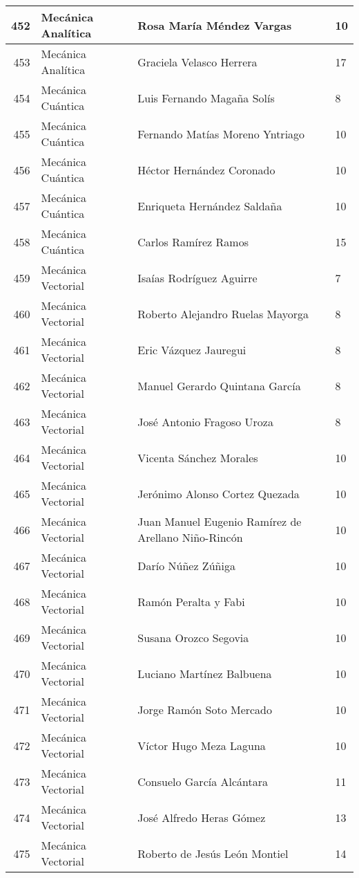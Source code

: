\begin{table}[ht]
\begin{tabular}{rlll}
  452 & Mecánica Analítica & Rosa María Méndez Vargas & 10 \\ \hline
  453 & Mecánica Analítica & Graciela Velasco Herrera & 17 \\ \hline
  454 & Mecánica Cuántica & Luis Fernando Magaña Solís & 8 \\ \hline
  455 & Mecánica Cuántica & Fernando Matías Moreno Yntriago & 10 \\ \hline
  456 & Mecánica Cuántica & Héctor Hernández Coronado & 10 \\ \hline
  457 & Mecánica Cuántica & Enriqueta Hernández Saldaña & 10 \\ \hline
  458 & Mecánica Cuántica & Carlos Ramírez Ramos & 15 \\ \hline
  459 & Mecánica Vectorial & Isaías Rodríguez Aguirre & 7 \\ \hline
  460 & Mecánica Vectorial & Roberto Alejandro Ruelas Mayorga & 8 \\ \hline
  461 & Mecánica Vectorial & Eric Vázquez Jauregui & 8 \\ \hline
  462 & Mecánica Vectorial & Manuel Gerardo Quintana García & 8 \\ \hline
  463 & Mecánica Vectorial & José Antonio Fragoso Uroza & 8 \\ \hline
  464 & Mecánica Vectorial & Vicenta Sánchez Morales & 10 \\ \hline
  465 & Mecánica Vectorial & Jerónimo Alonso Cortez Quezada & 10 \\ \hline
  466 & Mecánica Vectorial & Juan Manuel Eugenio Ramírez de Arellano Niño-Rincón & 10 \\ \hline
  467 & Mecánica Vectorial & Darío Núñez Zúñiga & 10 \\ \hline
  468 & Mecánica Vectorial & Ramón Peralta y Fabi & 10 \\ \hline
  469 & Mecánica Vectorial & Susana Orozco Segovia & 10 \\ \hline
  470 & Mecánica Vectorial & Luciano Martínez Balbuena & 10 \\ \hline
  471 & Mecánica Vectorial & Jorge Ramón Soto Mercado & 10 \\ \hline
  472 & Mecánica Vectorial & Víctor Hugo Meza Laguna & 10 \\ \hline
  473 & Mecánica Vectorial & Consuelo García Alcántara & 11 \\ \hline
  474 & Mecánica Vectorial & José Alfredo Heras Gómez & 13 \\ \hline
  475 & Mecánica Vectorial & Roberto de Jesús León Montiel & 14 \\ \hline

\end{tabular}
\end{table}
